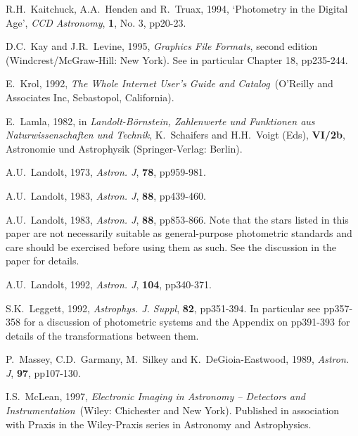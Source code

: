 \documentclass[twoside,11pt]{article}
\begin{document}
\begin{thebibliography}{99}
   R.H.~Kaitchuck, A.A.~Henden and R.~Truax,
   1994, `Photometry in the Digital Age', {\it CCD Astronomy}, {\bf 1},
   No. 3, pp20-23.

   D.C.~Kay and J.R.~Levine, 1995, {\it Graphics File
   Formats}, second edition
  \newline (Windcrest/McGraw-Hill: New York).  See in particular
   Chapter 18, pp235-244.

   E.~Krol, 1992, {\it The Whole Internet User's Guide
   and Catalog}\, (O'Reilly and Associates Inc, Sebastopol, California).

   E.~Lamla, 1982, in {\it Landolt-B\"{o}rnstein,
   Zahlenwerte und Funktionen aus Naturwissenschaften und Technik},
   K.~Schaifers and H.H.~Voigt (Eds), {\bf VI/2b}, Astronomie und
   Astrophysik (Springer-Verlag: Berlin).

   A.U.~Landolt, 1973, {\it Astron. J}, {\bf 78},
   pp959-981.

   A.U.~Landolt, 1983, {\it Astron. J}, {\bf 88},
   pp439-460.

   A.U.~Landolt, 1983, {\it Astron. J}, {\bf 88},
   pp853-866.  Note that the stars listed in this paper are not
   necessarily suitable as general-purpose photometric standards and
   care  should be exercised before using them as such.  See the
   discussion in the paper for details.

   A.U.~Landolt, 1992, {\it Astron. J}, {\bf 104},
   pp340-371.

   S.K.~Leggett, 1992, {\it Astrophys. J. Suppl}, {\bf
   82}, pp351-394.  In particular see pp357-358 for a discussion of
   photometric systems and the Appendix on pp391-393 for details of the
   transformations between them.

   P.~Massey, C.D.~Garmany, M.~Silkey and
   K.~DeGioia-Eastwood, 1989, {\it Astron. J}, {\bf 97}, pp107-130.

   I.S.~McLean, 1997, {\it Electronic Imaging in
   Astronomy -- Detectors and Instrumentation}\, (Wiley: Chichester and
   New York).  Published in association with Praxis in the Wiley-Praxis
   series in Astronomy and Astrophysics.


\end{thebibliography}
\end{document}

